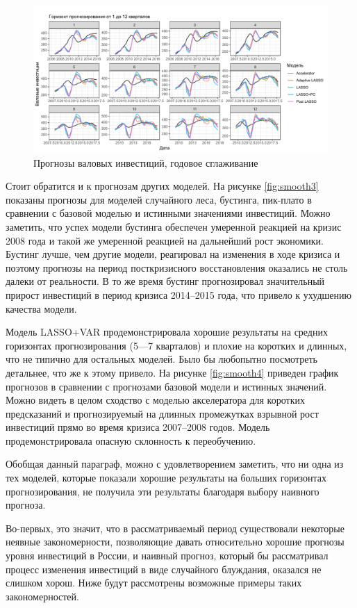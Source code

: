 \begin{figure}[hp]
    \centering
    \includegraphics[width = \textwidth]{smooth2.pdf}
    \caption{Прогнозы валовых инвестиций, годовое сглаживание}
    \label{fig:smooth1}
\end{figure}

Стоит обратится и к прогнозам других моделей. На рисунке \ref{fig:smooth3} показаны прогнозы для моделей случайного леса, бустинга, пик-плато в сравнении с базовой моделью и истинными значениями инвестиций. Можно заметить, что успех модели бустинга обеспечен умеренной реакцией на кризис 2008 года и такой же умеренной реакцией на дальнейший рост экономики. Бустинг лучше, чем другие модели, реагировал на изменения в ходе кризиса и поэтому прогнозы на период посткризисного восстановления оказались не столь далеки от реальности. В то же время бустинг прогнозировал значительный прирост инвестиций в период кризиса 2014--2015 года, что привело к ухудшению качества модели.

Модель LASSO+VAR продемонстрировала хорошие результаты на средних горизонтах прогнозирования (5---7 кварталов) и плохие на коротких и длинных, что не типично для остальных моделей. Было бы любопытно посмотреть детальнее, что же к этому привело. На рисунке \ref{fig:smooth4} приведен график прогнозов в сравнении с прогнозами базовой модели и истинных значений. Можно видеть в целом сходство с моделью акселератора для коротких предсказаний и прогнозируемый на длинных промежутках взрывной рост инвестиций прямо во время кризиса 2007--2008 годов. Модель продемонстрировала опасную склонность к переобучению. 

Обобщая данный параграф, можно с удовлетворением заметить, что ни одна из тех моделей, которые показали хорошие результаты на больших горизонтах прогнозирования, не получила эти результаты благодаря выбору наивного прогноза. 

Во-первых, это значит, что в рассматриваемый период существовали некоторые неявные закономерности, позволяющие давать относительно хорошие прогнозы уровня инвестиций в России, и наивный прогноз, который бы рассматривал процесс изменения инвестиций в виде случайного блуждания, оказался не слишком хорош. Ниже будут рассмотрены возможные примеры таких закономерностей.


